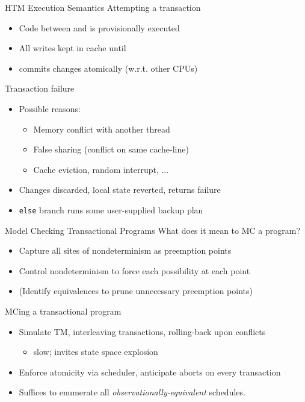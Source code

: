 \documentclass[xcolor=dvipsnames]{beamer}
\begin{document}
\begin{frame}{HTM Execution Semantics}
	Attempting a transaction
	\begin{itemize}
		\item Code between \xbegin and \xend is provisionally executed
		\item All writes kept in cache until \xend
		\item \xend commits changes atomically (w.r.t. other CPUs)
	\end{itemize}
	\pause
	\linegap

	Transaction failure
	\begin{itemize}
		\item Possible reasons:
			\begin{itemize}
				\item Memory conflict with another thread
				\item False sharing (conflict on same cache-line)
				\item Cache eviction, random interrupt, ...
			\end{itemize}
		\item Changes discarded, local state reverted, \xbegin returns failure
		\item {\tt else} branch runs some user-supplied backup plan
	\end{itemize}
\end{frame}

\begin{frame}{Model Checking Transactional Programs}
	What does it mean to MC a program?
	\begin{itemize}
		\item Capture all sites of nondeterminism as preemption points
		\item Control nondeterminism to force each possibility at each point
		\item (Identify equivalences to prune unnecessary preemption points)
	\end{itemize}
	\pause
	\linegap

	MCing a transactional program
	\begin{itemize}
		\item Simulate TM, interleaving transactions, rolling-back upon conflicts
			\begin{itemize}
				\item slow; invites state space explosion
			\end{itemize}
		\item Enforce atomicity via scheduler, anticipate aborts on every transaction
		\item Suffices to enumerate all {\em observationally-equivalent} schedules.
	\end{itemize}
\end{frame}
\end{document}
